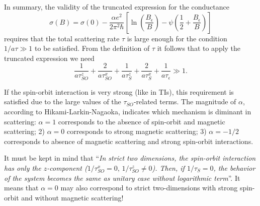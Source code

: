 \documentclass[11pt]{article} %
\begin{document}
In summary, the validity of the truncated expression for the conductance
\begin{equation}
	\sigma(B) = \sigma(0) -\frac{\alpha e^2}{2\pi^2\hbar}\left[\ln\left(\frac{B_\epsilon}{B}\right) - \psi\left(\frac{1}{2}+\frac{B_\epsilon}{B}\right)\right]
\end{equation}
requires that the total scattering rate $\tau$ is large enough for the condition $1/a\tau \gg 1$ to be satisfied. From the definition of $\tau$ it follows that to apply the truncated expression we need
\begin{equation}
	\displaystyle{\frac{1}{a\tau^z_{SO}}+\frac{2}{a\tau^x_{SO}}+\frac{1}{a\tau^z_{S}}+\frac{2}{a\tau^x_{S}}+\frac{1}{a\tau_{\epsilon}}}\gg 1.
\end{equation}

If the spin-orbit interaction is very strong (like in TIs), this requirement is satisfied due to the large values of the $\tau_{SO}$-related terms. The magnitude of $\alpha$, according to Hikami-Larkin-Nagaoka, indicates which mechanism is diminant in scattering: $\alpha = 1$ corresponds to the absence of spin-orbit and magnetic scattering; 2) $\alpha = 0$ corresponds to strong magnetic scattering; 3) $\alpha = -1/2$ corresponds to absence of magnetic scattering and strong spin-orbit interactions. 

It must be kept in mind that ``{\it In strict two dimensions, the spin-orbit interaction has only the $z$-component ($1/\tau^x_{SO} = 0,\, 1/\tau^z_{SO} \ne 0$). Then, if $1/\tau_S = 0$, the behavior of the system becomes the same as unitary case without logarithmic term}''. It means that $\alpha = 0$ may also correspond to strict two-dimensions with strong spin-orbit and without magnetic scattering!
\end{document}
